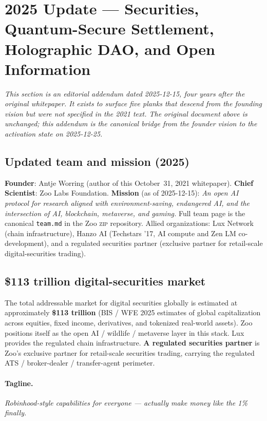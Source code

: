 \section{2025 Update --- Securities, Quantum-Secure Settlement, Holographic DAO, and Open Information}
\label{sec:2025-update}

\textit{This section is an editorial addendum dated 2025-12-15, four
years after the original whitepaper. It exists to surface five planks
that descend from the founding vision but were not specified in the
2021 text. The original document above is unchanged; this addendum is
the canonical bridge from the founder vision to the activation state
on 2025-12-25.}

\subsection{Updated team and mission (2025)}

\textbf{Founder}: Antje Worring (author of this October~31, 2021
whitepaper). \textbf{Chief Scientist}: Zoo Labs Foundation. \textbf{Mission} (as
of 2025-12-15): \emph{An open AI protocol for research aligned with
environment-saving, endangered AI, and the intersection of AI,
blockchain, metaverse, and gaming.} Full team page is the canonical
\texttt{team.md} in the Zoo \textsc{zip} repository. Allied
organizations: Lux Network (chain infrastructure), Hanzo AI (Techstars
'17, AI compute and Zen LM co-development), and a regulated securities
partner (exclusive partner for retail-scale digital-securities trading).

\subsection{\$113 trillion digital-securities market}

The total addressable market for digital securities globally is
estimated at approximately \textbf{\$113 trillion} (BIS / WFE 2025
estimates of global capitalization across equities, fixed income,
derivatives, and tokenized real-world assets). Zoo positions itself as
the open AI / wildlife / metaverse layer in this stack. Lux provides
the regulated chain infrastructure. \textbf{A regulated securities partner} is Zoo's
exclusive partner for retail-scale securities trading, carrying the
regulated ATS / broker-dealer / transfer-agent perimeter.

\paragraph{Tagline.} \emph{Robinhood-style capabilities for everyone ---
actually make money like the 1\% finally.}

